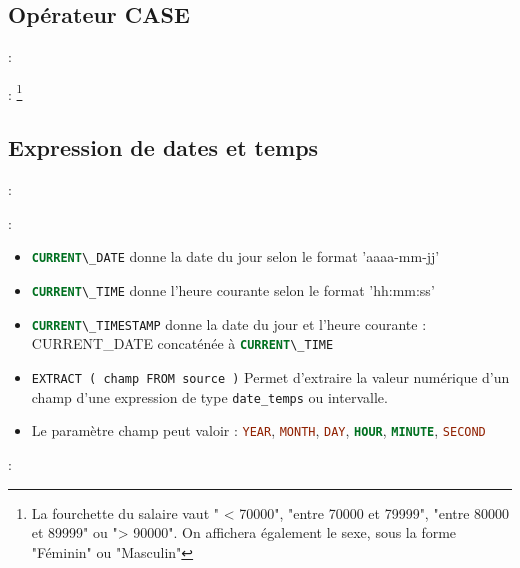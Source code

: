 \documentclass[10pt]{beamer}
\begin{document}
\subsection{Opérateur CASE}
\begin{frame}{\secname : \subsecname}
    
\end{frame}

\begin{frame}{\secname : \subsecname}
    \footnote{
        La fourchette du salaire vaut " < 70000", "entre 70000 et 79999", "entre 80000 et 89999" ou "> 90000".
        On affichera également le sexe, sous la forme "Féminin" ou "Masculin"}
\end{frame}

\subsection{Expression de dates et temps}
\begin{frame}{\secname : \subsecname}
    
\end{frame}

\begin{frame}{\secname : \subsecname}
    \begin{itemize}
        \item \lstinline[language=sql]!CURRENT\_DATE! donne la date du jour selon le format 'aaaa-mm-jj'
        \item \lstinline[language=sql]!CURRENT\_TIME! donne l'heure courante selon le format 'hh:mm:ss'
        \item \lstinline[language=sql]!CURRENT\_TIMESTAMP! donne la date du jour et l'heure courante : CURRENT\_DATE concaténée à \lstinline[language=sql]!CURRENT\_TIME!
        \item \lstinline[language=bnf]!EXTRACT ( champ FROM source )! Permet d'extraire la valeur numérique d'un champ d'une expression de type \lstinline[language=bnf]!date_temps! ou intervalle.
        \item Le paramètre champ peut valoir : \lstinline[language=sql]!YEAR!, \lstinline[language=sql]!MONTH!, \lstinline[language=sql]!DAY!, \lstinline[language=sql]!HOUR!, \lstinline[language=sql]!MINUTE!, \lstinline[language=sql]!SECOND!
    \end{itemize}
\end{frame}
\begin{frame}{\secname : \subsecname}
    
\end{frame}
\end{document}
